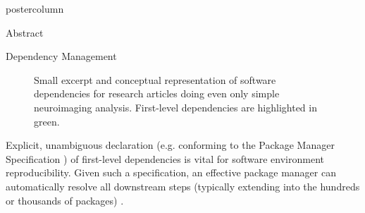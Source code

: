 \documentclass[xcolor=table]{beamer}
\newlength{\columnheight}
\begin{document}
\begin{frame}
\begin{columns}
	\begin{column}{.43\textwidth}
		\begin{beamercolorbox}[center]{postercolumn}
			\begin{minipage}{.98\textwidth}  %
				\parbox[t][\columnheight]{\textwidth}{ %
					\begin{myblock}{Abstract}
						
					\end{myblock}\vfill
					\vspace{-0.3em}
					\begin{myblock}{Dependency Management}
						\begin{figure}
							\captionsetup{width=.9\linewidth}
							\vspace{-1.2em}
							\vspace{-1.8em}
							\caption{
								Small excerpt and conceptual representation of software dependencies for research articles doing even only simple neuroimaging analysis.
								First-level dependencies are highlighted in green.
							}
							\vspace{1em}
						\end{figure}

						Explicit, unambiguous declaration (e.g. conforming to the Package Manager Specification \cite{pms}) of first-level dependencies is vital for software environment reproducibility.
						Given such a specification, an effective package manager can automatically resolve all downstream steps (typically extending into the hundreds or thousands of packages) \cite{ng}.


\end{myblock}}
\end{minipage}
\end{beamercolorbox}
\end{column}
\end{columns}
\end{frame}
\end{document}
